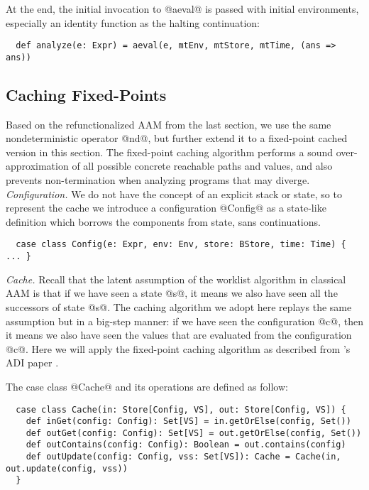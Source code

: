 \documentclass[acmsmall, review]{acmart}\settopmatter{}
\begin{document}
At the end, the initial invocation to @aeval@ is passed with initial environments,
especially an identity function as the halting continuation:
\begin{lstlisting}
  def analyze(e: Expr) = aeval(e, mtEnv, mtStore, mtTime, (ans => ans))
\end{lstlisting}

\subsection{Caching Fixed-Points}

Based on the refunctionalized AAM from the last section, we use the same nondeterministic
operator @nd@, but further extend it to a fixed-point cached version in this section.
The fixed-point caching algorithm performs a sound over-approximation of all possible
concrete reachable paths and values, and also prevents non-termination when analyzing 
programs that may diverge. \\

\textit{Configuration.}
We do not have the concept of an explicit stack or state, so to represent the cache 
we introduce a configuration @Config@ as a state-like definition which borrows the 
components from state, sans continuations.

\begin{lstlisting}
  case class Config(e: Expr, env: Env, store: BStore, time: Time) { ... }
\end{lstlisting}

\textit{Cache.}
Recall that the latent assumption of the worklist algorithm in classical AAM is that 
if we have seen a state @s@, it means we also have seen all the successors of state @s@.
The caching algorithm we adopt here replays the same assumption but in a big-step 
manner: if we have seen the configuration @c@, then it means we also have seen the 
values that are evaluated from the configuration @c@.
Here we will apply the fixed-point caching algorithm as described from
\citeauthor{darais2017abstracting}'s ADI paper \cite{darais2017abstracting}.

The case class @Cache@ and its operations are defined as follow:

\begin{lstlisting}
  case class Cache(in: Store[Config, VS], out: Store[Config, VS]) {
    def inGet(config: Config): Set[VS] = in.getOrElse(config, Set())
    def outGet(config: Config): Set[VS] = out.getOrElse(config, Set())
    def outContains(config: Config): Boolean = out.contains(config)
    def outUpdate(config: Config, vss: Set[VS]): Cache = Cache(in, out.update(config, vss))
  }
\end{lstlisting}
\end{document}
